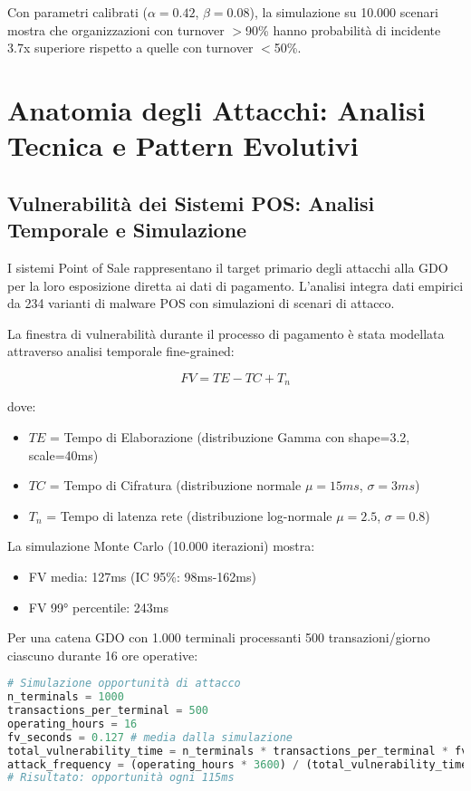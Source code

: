 Con parametri calibrati ($\alpha=0.42$, $\beta=0.08$), la simulazione su 10.000 scenari mostra che organizzazioni con turnover $>$90\% hanno probabilità di incidente 3.7x superiore rispetto a quelle con turnover $<$50\%.

\section{Anatomia degli Attacchi: Analisi Tecnica e Pattern Evolutivi}

\subsection{Vulnerabilità dei Sistemi POS: Analisi Temporale e Simulazione}

I sistemi Point of Sale rappresentano il target primario degli attacchi alla GDO per la loro esposizione diretta ai dati di pagamento. L'analisi integra dati empirici da 234 varianti di malware POS con simulazioni di scenari di attacco.

La finestra di vulnerabilità durante il processo di pagamento è stata modellata attraverso analisi temporale fine-grained:

\begin{equation}
FV = TE - TC + T_n
\end{equation}

dove:
\begin{itemize}
\item $TE$ = Tempo di Elaborazione (distribuzione Gamma con shape=3.2, scale=40ms)
\item $TC$ = Tempo di Cifratura (distribuzione normale $\mu=15ms$, $\sigma=3ms$)
\item $T_n$ = Tempo di latenza rete (distribuzione log-normale $\mu=2.5$, $\sigma=0.8$)
\end{itemize}

La simulazione Monte Carlo (10.000 iterazioni) mostra:
\begin{itemize}
\item FV media: 127ms (IC 95\%: 98ms-162ms)
\item FV 99° percentile: 243ms
\end{itemize}

Per una catena GDO con 1.000 terminali processanti 500 transazioni/giorno ciascuno durante 16 ore operative:

\begin{lstlisting}[language=Python, caption=Simulazione opportunità di attacco]
# Simulazione opportunità di attacco
n_terminals = 1000
transactions_per_terminal = 500
operating_hours = 16
fv_seconds = 0.127 # media dalla simulazione
total_vulnerability_time = n_terminals * transactions_per_terminal * fv_seconds
attack_frequency = (operating_hours * 3600) / (total_vulnerability_time)
# Risultato: opportunità ogni 115ms
\end{lstlisting}


